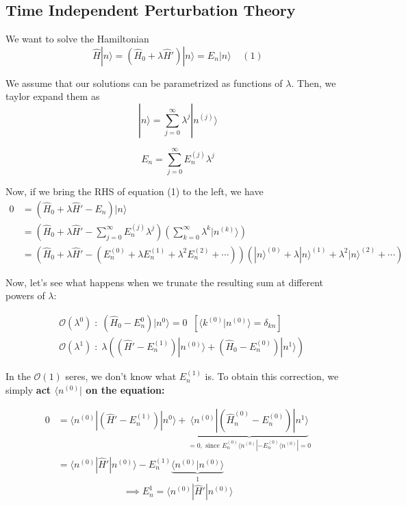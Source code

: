 \documentclass{article}
\newcommand{\ket}[1]{|#1 \rangle}
\newcommand{\bra}[1]{\langle #1|}
\newcommand{\inner}[2]{\langle #1 | #2 \rangle}
\begin{document}
\vskip 1cm
\subsection{Time Independent Perturbation Theory}

We want to solve the Hamiltonian
\[ \hat{H}\ket{n} = \left(\hat{H}_0 + \lambda \hat{H}'\right) \ket{n} = E_n \ket{n} \;\;\;\; (1)\]

We assume that our solutions can be parametrized as functions of $\lambda$. Then, we taylor expand them as  
\[ \ket{n} = \sum_{j = 0}^{\infty} \lambda^{j} \ket{n^{(j)}} \]

\[ E_n = \sum_{j = 0}^{\infty} E_n^{(j)} \lambda^j  \]

Now, if we bring the RHS of equation (1) to the left, we have
\begin{align*}
  0 &= \left(\hat{H}_0 + \lambda \hat{H}' - E_n \right) \ket{n} \\
  &= \left(\hat{H}_0 + \lambda \hat{H}' - \sum_{j = 0}^{\infty} E_n^{(j)} \lambda^j \right) \left( \sum_{k = 0}^{\infty} \lambda^{k} \ket{n^{(k)}} \right) \\
  &= \left(\hat{H}_0 + \lambda \hat{H}' - (E_n^{(0)} + \lambda E_n^{(1)} + \lambda^2 E_n^{(2)} + \cdots )\right) \left( \ket{n}^{(0)} + \lambda \ket{n}^{(1)} + \lambda^2 \ket{n}^{(2)} + \cdots  \right) 
\end{align*}

Now, let's see what happens when we trunate the resulting sum at different powers of $\lambda$:

\begin{align*}
  &\mathcal{O}(\lambda^0) \;:\; \left( \hat{H}_0 - E_n^{0} \right) \ket{n^{0}} = 0\;\;\left[ \inner{k^{(0)}}{n^{(0)}} = \delta_{kn} \right] \\
  &\mathcal{O}(\lambda^1) \;:\; \lambda \left( \left( \hat{H}' - E_n^{(1)} \right) \ket{n^{(0)}}  +  \left( \hat{H}_0  - E_n^{(0)} \right)\ket{n^{1}} \right)
\end{align*}

In the $\mathcal{O}(1)$ seres, we don't know what $E_n^{(1)}$ is. To obtain this correction, we simply \textbf{act $\bra{n^{(0)}}$ on the equation:}

\begin{align*}
  0 &= \inner{n^{(0)}}{\left( \hat{H}' - E_n^{(1)} \right) | n^{0}} + \underbrace{\inner{n^{(0)}}{\left( \hat{H}_n^{(0)} - E_n^{(0)} \right) | n^{1} }}_{ = 0, \text{ since } E_n^{(0)} \bra{n^{(0)}} - E_n^{(0)} \bra{n^{(0)}}  = 0} \\
  &= \inner{n^{(0)}}{\hat{H}'|n^{(0)}} - E_n^{(1)} \underbrace{\inner{n^{(0)}}{n^{(0)}}}_{1}
\end{align*}
\[ \implies \boxed{E_n^{1} = \inner{n^{(0)}}{\hat{H}'|n^{(0)}}} \]
\end{document}
